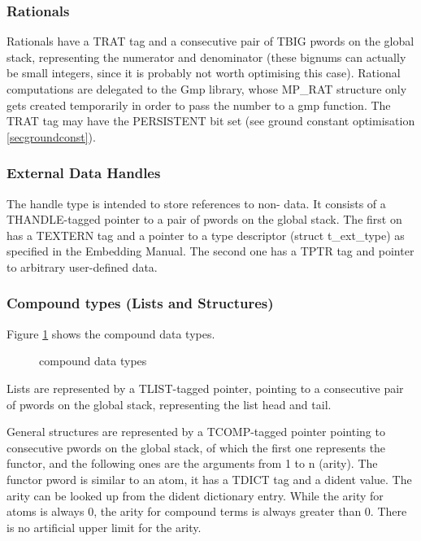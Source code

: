 \subsubsection{Rationals}
Rationals  have a TRAT  tag and a consecutive pair of TBIG pwords on the
global stack, representing the numerator  and denominator  (these
bignums can actually be small integers, since it is probably not worth
optimising this case).  Rational computations are delegated to the Gmp
library, whose MP_RAT structure only gets created temporarily in order
to pass the number to a gmp function.
The TRAT tag may have the PERSISTENT bit set (see ground constant optimisation
\ref{secgroundconst}).

\subsubsection{External Data Handles}
The handle type is intended to store references to non-{\eclipse} data.
It consists of a THANDLE-tagged pointer to a pair of pwords on the global
stack. The first on has a TEXTERN tag and a pointer to a type descriptor
(struct t_ext_type) as specified in the Embedding Manual. The second one
has a TPTR tag and pointer to arbitrary user-defined data.

\subsubsection{Compound types (Lists and Structures)}
Figure \ref{figcompound} shows the compound data types.
\begin{figure}
\label{figcompound}
\caption{{\eclipse} compound data types}
\end{figure}
Lists  are represented by a TLIST-tagged pointer, pointing to a consecutive
pair of pwords on the global stack, representing the list head  and tail.

General structures  are represented by a TCOMP-tagged pointer pointing to
consecutive pwords on the global stack, of which the first one represents
the functor, and the following ones are the arguments from 1 to n (arity).
The functor pword is similar to an atom, it has a TDICT  tag and a dident
value.  The arity  can be looked up from the dident dictionary entry.
While the arity for atoms is always 0, the arity for compound terms is
always greater than 0.  There is no artificial upper limit for the arity.

